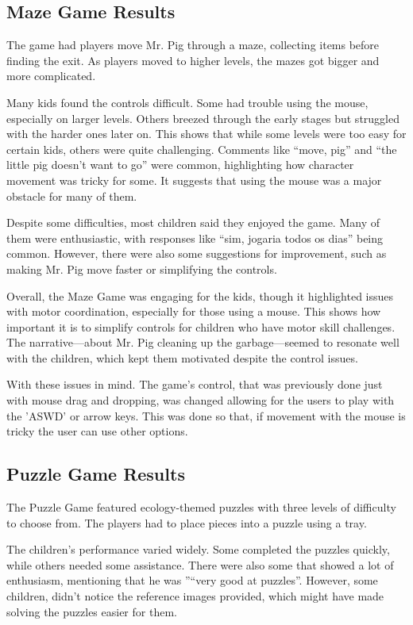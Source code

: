 \subsection{Maze Game Results}
The game had players move Mr. Pig through a maze, collecting items before finding the exit. As players moved to higher levels, the mazes got bigger and more complicated.

Many kids found the controls difficult. Some had trouble using the mouse, especially on larger levels. Others breezed through the early stages but struggled with the harder ones later on. This shows that while some levels were too easy for certain kids, others were quite challenging. Comments like “move, pig” and “the little pig doesn’t want to go” were common, highlighting how character movement was tricky for some. It suggests that using the mouse was a major obstacle for many of them.

Despite some difficulties, most children said they enjoyed the game. Many of them were enthusiastic, with responses like “sim, jogaria todos os dias” being common. However, there were also some suggestions for improvement, such as making Mr. Pig move faster or simplifying the controls.

Overall, the Maze Game was engaging for the kids, though it highlighted issues with motor coordination, especially for those using a mouse. This shows how important it is to simplify controls for children who have motor skill challenges. The narrative—about Mr. Pig cleaning up the garbage—seemed to resonate well with the children, which kept them motivated despite the control issues.

With these issues in mind. The game's control, that was previously done just with mouse drag and dropping, was changed allowing for the users to play with the 'ASWD' or arrow keys. This was done so that, if movement with the mouse is tricky the user can use other options.

\newpage
\subsection{Puzzle Game Results}

The Puzzle Game featured ecology-themed puzzles with three levels of difficulty to choose from. The players had to place pieces into a puzzle using a tray.

The children’s performance varied widely. Some completed the puzzles quickly, while others needed some assistance. There were also some that showed a lot of enthusiasm, mentioning that he was ''“very good at puzzles''. However, some children, didn’t notice the reference images provided, which might have made solving the puzzles easier for them.

